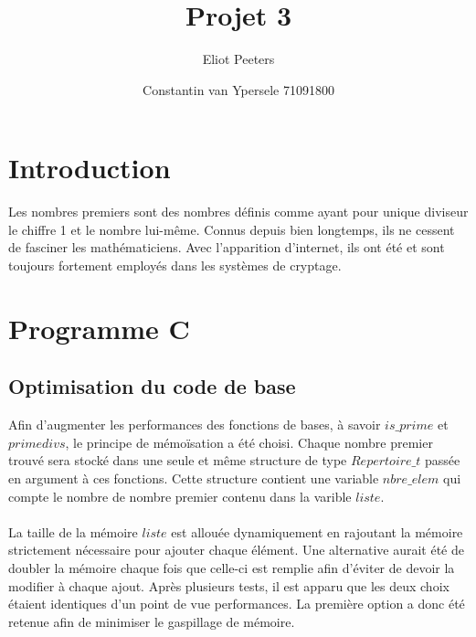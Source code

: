\documentclass{article}
\title{Projet 3}
\author{Eliot Peeters}
\author{Constantin van Ypersele 71091800}
\begin{document}
\maketitle

\section{Introduction}
Les nombres premiers sont des nombres définis comme ayant pour unique diviseur le chiffre 1 et le nombre lui-même. Connus depuis bien longtemps, ils ne cessent de fasciner les mathématiciens. Avec l'apparition d'internet, ils ont été et sont toujours fortement employés dans les systèmes de cryptage.

\section{Programme C}

\subsection{Optimisation du code de base}
Afin d'augmenter les performances des fonctions de bases, à savoir $is\_prime$ et $primedivs$, le principe de mémoïsation a été choisi. Chaque nombre premier trouvé sera stocké dans une seule et même structure de type $Repertoire\_t$ passée en argument à ces fonctions. Cette structure contient une variable $nbre\_elem$ qui compte le nombre de nombre premier contenu dans la varible $liste$. \\ \\
\danger La taille de la mémoire $liste$ est allouée dynamiquement en rajoutant la mémoire strictement nécessaire pour ajouter chaque élément. Une alternative aurait été de doubler la mémoire chaque fois que celle-ci est remplie afin d'éviter de devoir la modifier à chaque ajout. Après plusieurs tests, il est apparu que les deux choix étaient identiques d'un point de vue performances. La première option a donc été retenue afin de minimiser le gaspillage de mémoire. 
\end{document}
